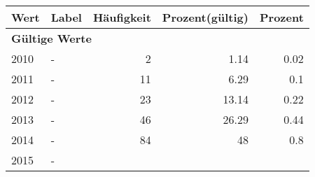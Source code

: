      \begin{longtable}{lXrrr}
     \toprule
     \textbf{Wert} & \textbf{Label} & \textbf{Häufigkeit} & \textbf{Prozent(gültig)} & \textbf{Prozent} \\
     \endhead
     \midrule
     \multicolumn{5}{l}{\textbf{Gültige Werte}}\\

     2010 &
     \multicolumn{1}{X}{ -  } &


       \num{2} &
       \num[round-mode=places,round-precision=2]{1.14} &
         \num[round-mode=places,round-precision=2]{0.02} \\

     2011 &
     \multicolumn{1}{X}{ -  } &


       \num{11} &
       \num[round-mode=places,round-precision=2]{6.29} &
         \num[round-mode=places,round-precision=2]{0.1} \\

     2012 &
     \multicolumn{1}{X}{ -  } &


       \num{23} &
       \num[round-mode=places,round-precision=2]{13.14} &
         \num[round-mode=places,round-precision=2]{0.22} \\

     2013 &
     \multicolumn{1}{X}{ -  } &


       \num{46} &
       \num[round-mode=places,round-precision=2]{26.29} &
         \num[round-mode=places,round-precision=2]{0.44} \\

     2014 &
     \multicolumn{1}{X}{ -  } &


       \num{84} &
       \num[round-mode=places,round-precision=2]{48} &
         \num[round-mode=places,round-precision=2]{0.8} \\

     2015 &
     \multicolumn{1}{X}{ -  } &



\end{longtable}
